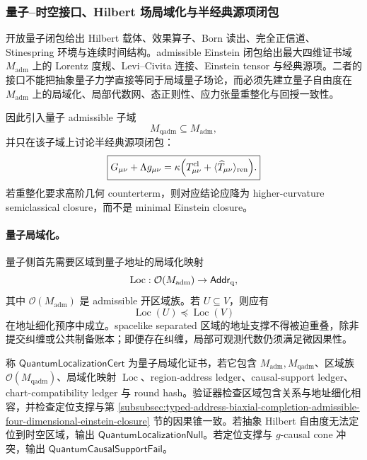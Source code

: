 \subsubsection{量子--时空接口、Hilbert 场局域化与半经典源项闭包}\label{subsubsec:typed-address-biaxial-completion-quantum-spacetime-interface-semiclassical-source-closure}
开放量子闭包给出 Hilbert 载体、效果算子、Born 读出、完全正信道、Stinespring 环境与连续时间结构。admissible Einstein 闭包给出最大四维证书域 \(M_{\mathrm{adm}}\) 上的 Lorentz 度规、Levi--Civita 连接、Einstein tensor 与经典源项。二者的接口不能把抽象量子力学直接等同于局域量子场论，而必须先建立量子自由度在 \(M_{\mathrm{adm}}\) 上的局域化、局部代数网、态正则性、应力张量重整化与回授一致性。

因此引入量子 admissible 子域
\[
M_{\mathrm{qadm}}\subseteq M_{\mathrm{adm}},
\]
并只在该子域上讨论半经典源项闭包：
\[
\boxed{
G_{\mu\nu}+\Lambda g_{\mu\nu}
=
\kappa\Bigl(
T^{\rm cl}_{\mu\nu}
+
\langle\widehat T_{\mu\nu}\rangle_{\rm ren}
\Bigr).
}
\]
若重整化要求高阶几何 counterterm，则对应结论应降为 higher-curvature semiclassical closure，而不是 minimal Einstein closure。

\paragraph{量子局域化。}
量子侧首先需要区域到量子地址的局域化映射
\[
\operatorname{Loc}:\mathcal O(M_{\mathrm{adm}})\to\mathsf{Addr}_{\rm q},
\]
其中 \(\mathcal O(M_{\mathrm{adm}})\) 是 admissible 开区域族。若 \(U\subseteq V\)，则应有
\[
\operatorname{Loc}(U)\preceq\operatorname{Loc}(V)
\]
在地址细化预序中成立。spacelike separated 区域的地址支撑不得被迫重叠，除非提交纠缠或公共制备账本；即便存在纠缠，局部可观测代数仍须满足微因果性。

\begin{definition}[量子局域化证书]\label{def:typed-address-biaxial-completion-quantum-localization-cert}
称 \(\mathsf{QuantumLocalizationCert}\) 为量子局域化证书，若它包含 \(M_{\mathrm{adm}},M_{\mathrm{qadm}}\)、区域族 \(\mathcal O(M_{\mathrm{qadm}})\)、局域化映射 \(\operatorname{Loc}\)、region-address ledger、causal-support ledger、chart-compatibility ledger 与 round hash。验证器检查区域包含关系与地址细化相容，并检查定位支撑与第 \ref{subsubsec:typed-address-biaxial-completion-admissible-four-dimensional-einstein-closure} 节的因果锥一致。若抽象 Hilbert 自由度无法定位到时空区域，输出 \(\mathsf{QuantumLocalizationNull}\)。若定位支撑与 \(g\)-causal cone 冲突，输出 \(\mathsf{QuantumCausalSupportFail}\)。
\end{definition}

